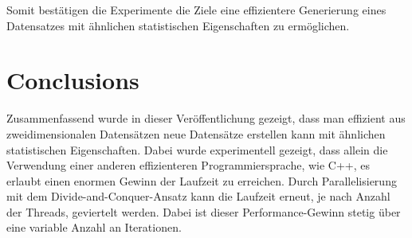 \documentclass[sigconf]{acmart}
\begin{document}
Somit bestätigen die Experimente die Ziele eine effizientere Generierung eines Datensatzes mit ähnlichen statistischen Eigenschaften zu ermöglichen.   


\section{Conclusions}

Zusammenfassend wurde  in dieser Veröffentlichung gezeigt, dass man effizient aus zweidimensionalen Datensätzen neue Datensätze erstellen kann mit ähnlichen statistischen Eigenschaften. Dabei wurde experimentell gezeigt, dass allein die Verwendung einer anderen effizienteren Programmiersprache, wie C++, es erlaubt einen enormen Gewinn der Laufzeit zu erreichen. Durch Parallelisierung mit dem Divide-and-Conquer-Ansatz kann die Laufzeit erneut, je nach Anzahl der Threads, geviertelt werden. Dabei ist dieser Performance-Gewinn stetig über eine variable Anzahl an Iterationen. 



\end{document}
